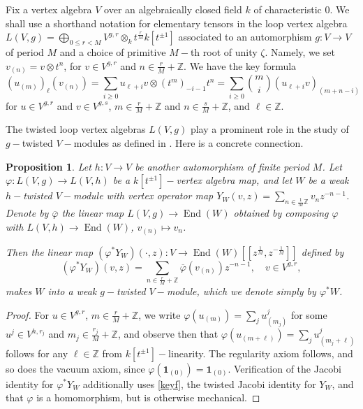 \documentclass{article}
\newtheorem{prop}[thm]{Proposition}
\theoremstyle{definition}
\def\End{\ensuremath{\operatorname{End}}}
\begin{document}
Fix a vertex algebra $V$ over an algebraically closed  field $k$ of characteristic 0. We shall use a shorthand notation for elementary tensors in the loop vertex algebra $L(V,g) = \bigoplus_{0 \leq r < M} V^{g,r} \otimes_k t^{\frac{r}{M}} k[t^{\pm 1}]$ associated to an automorphism $g \colon V \to V$ of period $M$ and a choice of primitive $M-$th root of unity $\zeta$.
Namely, we set $v_{(n)} = v \otimes t^n$, for $v \in V^{g,r}$ and $n \in \frac{r}{M} + \mathbb Z$.
We have the key formula
\begin{equation} \label{keyf} (u_{(m)})_\ell(v_{(n)}) = \sum_{i \geq 0} u_{\ell+i} v \otimes (t^m)_{-i-1} t^n = \sum_{i \geq 0} \binom{m}{i} (u_{\ell+i} v)_{(m+n-i)} \end{equation}
	for $u \in V^{g,r}$ and $v \in V^{g,s}$, $m \in \frac{r}{M} + \mathbb Z$ and $n \in \frac{s}{M} + \mathbb Z$, and $\ell \in \mathbb Z$.

The twisted loop vertex algebras $L(V,g)$ play a prominent role in the study of $g-$twisted $V-$modules as defined in \cite[Def.\@ 3.1]{DLM}.
Here is a concrete connection.

\begin{prop}\label{tfiso}
    Let $h \colon V \to V$ be another automorphism of finite period $M$. Let $\varphi \colon L(V,g) \to L(V,h)$ be a $k[t^{\pm1}]-$vertex algebra map, and let $W$ be a weak $h-$twisted $V-$module with vertex operator map $Y_W(v,z) = \sum_{n \in \frac{1}{M} \mathbb Z} v_n z^{-n-1}$. 
    Denote by $\overline \varphi$ the linear map $L(V,g) \to \End(W)$ obtained by composing $\varphi$ with $L(V,h) \to \End(W)$, $v_{(n)} \mapsto v_n$. 
    
    Then the linear map $(\varphi^\ast Y_W)(\cdot, z) \colon V \to \End(W)[[z^{\frac{1}{M}},z^{-\frac{1}{M}}]]$ defined by 
	   \[ (\varphi^\ast Y_W) (v,z) = \sum_{n \in \frac{r}{M} + \mathbb Z} \overline \varphi(v_{(n)}) z^{-n-1}, \quad v \in V^{g,r}, \]
    makes $W$ into a weak $g-$twisted $V-$module, which we denote simply by $\varphi^\ast W$.
\end{prop}

\begin{proof}
	For $u \in V^{g,r}$, $m \in \frac{r}{M} + \mathbb Z$, we write $\varphi(u_{(m)}) = \sum_j u^j_{(m_j)}$ for some $u^j \in V^{h, r_j}$ and $m_j \in \frac{r_j}{M} + \mathbb Z$, and observe then that $\varphi (u_{(m+\ell)}) = \sum_j u^j_{(m_j+\ell)}$ follows for any $\ell \in \mathbb Z$ from $k[t^{\pm 1}]-$linearity.
	The regularity axiom follows, and so does the vacuum axiom, since $\varphi(\mathbf 1_{(0)}\!) = \mathbf 1_{(0)}$.
	Verification of the Jacobi identity  for $\varphi^\ast Y_W$ additionally uses \eqref{keyf}, the twisted Jacobi identity for $Y_W$, and that $\varphi$ is a homomorphism, but is otherwise mechanical.
\end{proof}
\end{document}
